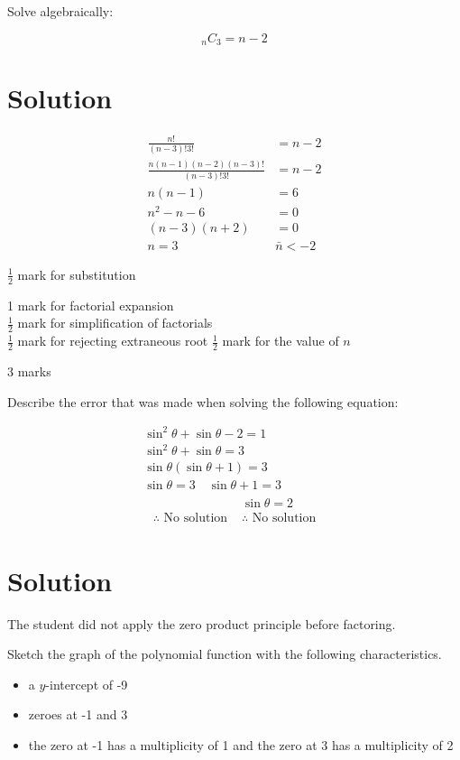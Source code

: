 \documentclass[10pt]{article}
\begin{document}
Solve algebraically:

$$
{ }_{n} C_{3}=n-2
$$

\section*{Solution}
$$
\begin{aligned}
\frac{n!}{(n-3)!3!} & =n-2 \\
\frac{n(n-1)(n-2)(n-3)!}{(n-3)!3!} & =n-2 \\
n(n-1) & =6 \\
n^{2}-n-6 & =0 \\
(n-3)(n+2) & =0 \\
n=3 & \bar{n}<-2
\end{aligned}
$$

$\frac{1}{2}$ mark for substitution

1 mark for factorial expansion\\
$\frac{1}{2}$ mark for simplification of factorials\\
$\frac{1}{2}$ mark for rejecting extraneous root $\frac{1}{2}$ mark for the value of $n$

3 marks

Describe the error that was made when solving the following equation:

$$
\begin{gathered}
\sin ^{2} \theta+\sin \theta-2=1 \\
\sin ^{2} \theta+\sin \theta=3 \\
\sin \theta(\sin \theta+1)=3 \\
\sin \theta=3 \quad \sin \theta+1=3 \\
\begin{aligned}
& \sin \theta=2 \\
\text { ∴ No solution } & \therefore \text { No solution }
\end{aligned}
\end{gathered}
$$

\section*{Solution}
The student did not apply the zero product principle before factoring.

Sketch the graph of the polynomial function with the following characteristics.

\begin{itemize}
  \item a $y$-intercept of -9
  \item zeroes at -1 and 3
  \item the zero at -1 has a multiplicity of 1 and the zero at 3 has a multiplicity of 2
\end{itemize}
\end{document}
